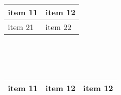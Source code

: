 \documentclass[14pt]{extarticle}
\begin{document}
\begin{tabu} to 1\textwidth { | X[l] | X[] |}
 \hline
 item 11 & item 12\\
 \hline
 item 21  & item 22\\
\hline
\end{tabu}
\\
\\
\\
\begin{tabu} to 1\textwidth { | X[l] | X[c]| X[r]|}
 \hline
 item 11 & item 12  & item 12\\
 \hline
 \end{tabu}
\end{document}
